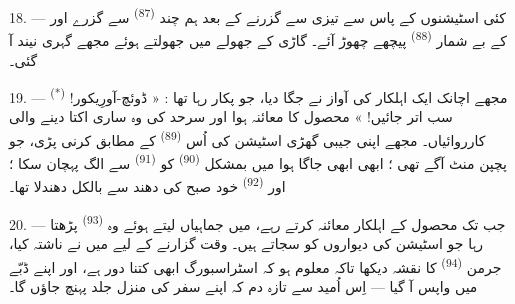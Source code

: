 18. --- کئی اسٹیشنوں کے پاس سے تیزی سے گزرنے کے بعد ہم چند
 \textsuperscript{(87)} سے گزرے اور  کے بے شمار  \textsuperscript{(88)} پیچھے چھوڑ
آئے۔ گاڑی کے جھولے میں جھولتے ہوئے مجھے گہری نیند آ گئی۔

\VUsaut{3.0mm}
\VUsaut{3.0mm}

19. --- مجھے اچانک ایک اہلکار کی آواز نے جگا دیا، جو پکار رہا تھا :
« ڈوئچ-آورِیکور! \textsuperscript{(*)} سب اتر جائیں! » محصول کا معائنہ
ہوا اور سرحد کی وہ ساری اکتا دینے والی کارروائیاں۔ مجھے اپنی جیبی
گھڑی اسٹیشن کی اُس  \textsuperscript{(89)} کے مطابق
کرنی پڑی، جو پچپن منٹ آگے تھی ؛ ابھی ابھی جاگا ہوا میں بمشکل
 \textsuperscript{(90)} کو 
\textsuperscript{(91)} سے الگ پہچان سکا ؛ اور 
\textsuperscript{(92)} خود صبح کی دھند سے بالکل دھندلا تھا۔

20. --- جب تک محصول کے اہلکار معائنہ کرتے رہے، میں جماہیاں لیتے ہوئے
وہ  \textsuperscript{(93)} پڑھتا رہا جو اسٹیشن کی
دیواروں کو سجاتے ہیں۔ وقت گزارنے کے لیے میں نے ناشتہ کیا، جرمن
 \textsuperscript{(94)} کا نقشہ دیکھا تاکہ معلوم ہو
کہ اسٹراسبورگ ابھی کتنا دور ہے، اور اپنے ڈبّے میں واپس آ گیا — اِس
اُمید سے تازہ دم کہ اپنے سفر کی منزل جلد پہنچ جاؤں گا۔

\VUsaut{6.0mm}
\VUfilet{22mm}
